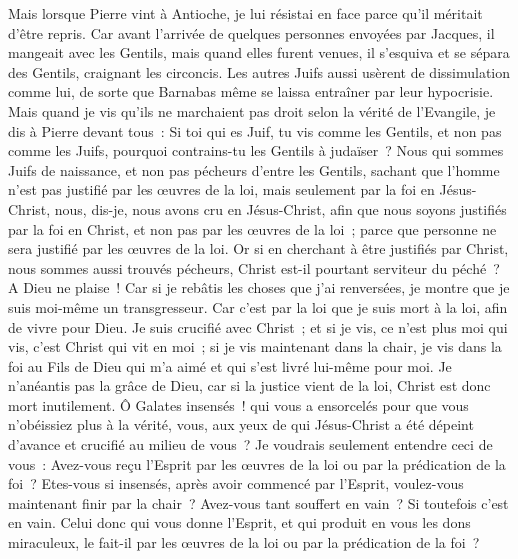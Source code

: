 \begin{multicols}{2}
Mais lorsque Pierre vint à Antioche, je lui résistai en face parce qu'il méritait d'être repris.
Car avant l'arrivée de quelques personnes envoyées par Jacques, il mangeait avec les Gentils, mais quand elles furent venues, il s'esquiva et se sépara des Gentils, craignant les circoncis.
Les autres Juifs aussi usèrent de dissimulation comme lui, de sorte que Barnabas même se laissa entraîner par leur hypocrisie.
Mais quand je vis qu'ils ne marchaient pas droit selon la vérité de l'Evangile, je dis à Pierre devant tous~: Si toi qui es Juif, tu vis comme les Gentils, et non pas comme les Juifs, pourquoi contrains-tu les Gentils à judaïser~?
Nous qui sommes Juifs de naissance, et non pas pécheurs d'entre les Gentils,
sachant que l'homme n'est pas justifié par les œuvres de la loi, mais seulement par la foi en Jésus-Christ, nous, dis-je, nous avons cru en Jésus-Christ, afin que nous soyons justifiés par la foi en Christ, et non pas par les œuvres de la loi~; parce que personne ne sera justifié par les œuvres de la loi.
Or si en cherchant à être justifiés par Christ, nous sommes aussi trouvés pécheurs, Christ est-il pourtant serviteur du péché~? A Dieu ne plaise~!
Car si je rebâtis les choses que j'ai renversées, je montre que je suis moi-même un transgresseur.
Car c'est par la loi que je suis mort à la loi, afin de vivre pour Dieu.
Je suis crucifié avec Christ~; et si je vis, ce n'est plus moi qui vis, c'est Christ qui vit en moi~; si je vis maintenant dans la chair, je vis dans la foi au Fils de Dieu qui m'a aimé et qui s'est livré lui-même pour moi.
Je n'anéantis pas la grâce de Dieu, car si la justice vient de la loi, Christ est donc mort inutilement.
\VerseOne{}Ô Galates insensés~! qui vous a ensorcelés pour que vous n'obéissiez plus à la vérité, vous, aux yeux de qui Jésus-Christ a été dépeint d'avance et crucifié au milieu de vous~?
Je voudrais seulement entendre ceci de vous~: Avez-vous reçu l'Esprit par les œuvres de la loi ou par la prédication de la foi~?
Etes-vous si insensés, après avoir commencé par l'Esprit, voulez-vous maintenant finir par la chair~?
Avez-vous tant souffert en vain~? Si toutefois c'est en vain.
Celui donc qui vous donne l'Esprit, et qui produit en vous les dons miraculeux, le fait-il par les œuvres de la loi ou par la prédication de la foi~?

\end{multicols}
